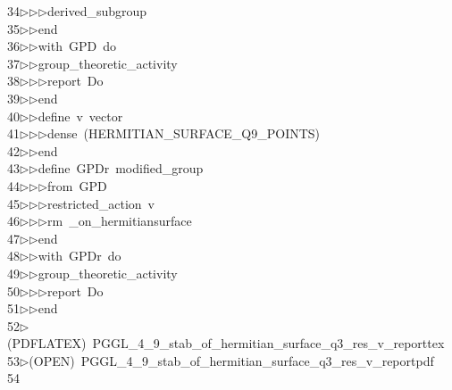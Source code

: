 \begin{tabbing}
34\>$\triangleright$\>$\triangleright$\>$\triangleright$\>derived\_subgroup\ \\[0pt]
35\>$\triangleright$\>$\triangleright$\>end\ \\[0pt]
36\>$\triangleright$\>$\triangleright$\>with\ GPD\ do\ \\[0pt]
37\>$\triangleright$\>$\triangleright$\>group\_theoretic\_activity\ \\[0pt]
38\>$\triangleright$\>$\triangleright$\>$\triangleright$\>report\ Do\ \\[0pt]
39\>$\triangleright$\>$\triangleright$\>end\ \\[0pt]
40\>$\triangleright$\>$\triangleright$\>define\ v\ vector\ \\[0pt]
41\>$\triangleright$\>$\triangleright$\>$\triangleright$\>dense\ (HERMITIAN\_SURFACE\_Q9\_POINTS)\ \\[0pt]
42\>$\triangleright$\>$\triangleright$\>end\ \\[0pt]
43\>$\triangleright$\>$\triangleright$\>define\ GPDr\ modified\_group\ \\[0pt]
44\>$\triangleright$\>$\triangleright$\>$\triangleright$\>from\ GPD\ \\[0pt]
45\>$\triangleright$\>$\triangleright$\>$\triangleright$\>restricted\_action\ v\ \\[0pt]
46\>$\triangleright$\>$\triangleright$\>$\triangleright$\>rm\ \_on\_hermitiansurface\ \\[0pt]
47\>$\triangleright$\>$\triangleright$\>end\ \\[0pt]
48\>$\triangleright$\>$\triangleright$\>with\ GPDr\ do\ \\[0pt]
49\>$\triangleright$\>$\triangleright$\>group\_theoretic\_activity\ \\[0pt]
50\>$\triangleright$\>$\triangleright$\>$\triangleright$\>report\ Do\ \\[0pt]
51\>$\triangleright$\>$\triangleright$\>end\\[0pt]
52\>$\triangleright$\>(PDFLATEX)\ PGGL\_4\_9\_stab\_of\_hermitian\_surface\_q3\_res\_v\_reporttex\\[0pt]
53\>$\triangleright$\>(OPEN)\ PGGL\_4\_9\_stab\_of\_hermitian\_surface\_q3\_res\_v\_reportpdf\\[0pt]
54\>\end{tabbing}

